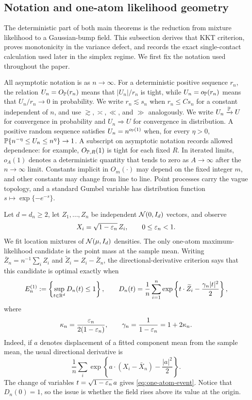 \subsection{Notation and one-atom likelihood geometry}\label{sec:mv-one-atom-geometry}

The deterministic part of both main theorems is the reduction from mixture
likelihood to a Gaussian-bump field. This subsection derives that KKT
criterion, proves monotonicity in the variance defect, and records the exact
single-contact calculation used later in the simplex regime. We first fix the
notation used throughout the paper.

All asymptotic notation is as $n\to\infty$. For a deterministic positive
sequence $r_n$, the relation $U_n=O_{\mathbb P}(r_n)$ means that
$|U_n|/r_n$ is tight, while $U_n=o_{\mathbb P}(r_n)$ means that
$U_n/r_n\to0$ in probability. We write $r_n\lesssim s_n$ when
$r_n\le C s_n$ for a constant independent of $n$, and use
$\gtrsim,\asymp,\ll$, and $\gg$ analogously. We write
$U_n\xrightarrow{\mathbb P}U$ for convergence in
probability and $U_n\Rightarrow U$ for convergence in distribution. A
positive random sequence satisfies $U_n=n^{o_{\mathbb P}(1)}$ when, for every
$\eta>0$, $\mathbb P\{n^{-\eta}\le U_n\le n^\eta\}\to1$. A
subscript on asymptotic notation records allowed dependence: for example,
$O_{\mathbb P,R}(1)$ is tight for each fixed $R$. In iterated limits,
$o_A(1)$ denotes a deterministic quantity that tends to zero as
$A\to\infty$ after the $n\to\infty$ limit. Constants implicit in
$O_m(\cdot)$ may depend on the fixed integer $m$, and other constants may
change from line to line. Point processes carry the vague topology, and a
standard Gumbel variable has distribution function
$s\mapsto\exp\{-e^{-s}\}$.

Let \(d=d_n\ge2\), let \(Z_1,\ldots,Z_n\) be independent
\(\mathcal N(0,I_d)\) vectors, and observe
\[
  X_i=\sqrt{1-\varepsilon_n}\,Z_i,
  \qquad 0\le\varepsilon_n<1.
\]
We fit location mixtures of \(\mathcal N(\mu,I_d)\) densities. The only one-atom
maximum-likelihood candidate is the point mass at the sample mean. Writing
\(\bar Z_n=n^{-1}\sum_iZ_i\) and
\(\widetilde Z_i=Z_i-\bar Z_n\), the directional-derivative criterion says
that this candidate is optimal exactly when
\begin{equation}
\label{eq:one-atom-event}
  E_n^{(1)}
  :=
  \left\{\sup_{t\in\mathbb R^d}D_n(t)\le1\right\},
  \qquad
  D_n(t)
  =
  \frac1n\sum_{i=1}^n
  \exp\left\{t\cdot\widetilde Z_i-\frac{\gamma_n|t|^2}{2}\right\},
\end{equation}
where
\begin{equation}
\label{eq:gamma-definition}
  \kappa_n=\frac{\varepsilon_n}{2(1-\varepsilon_n)},
  \qquad
  \gamma_n=\frac1{1-\varepsilon_n}=1+2\kappa_n.
\end{equation}
Indeed, if \(a\) denotes displacement of a fitted component mean from the
sample mean, the usual directional derivative is
\[
  \frac1n\sum_i
  \exp\left\{a\cdot(X_i-\bar X_n)-\frac{|a|^2}{2}\right\}.
\]
The change of variables \(t=\sqrt{1-\varepsilon_n}\,a\) gives
\eqref{eq:one-atom-event}. Notice that \(D_n(0)=1\), so the issue is whether
the field rises above its value at the origin.

